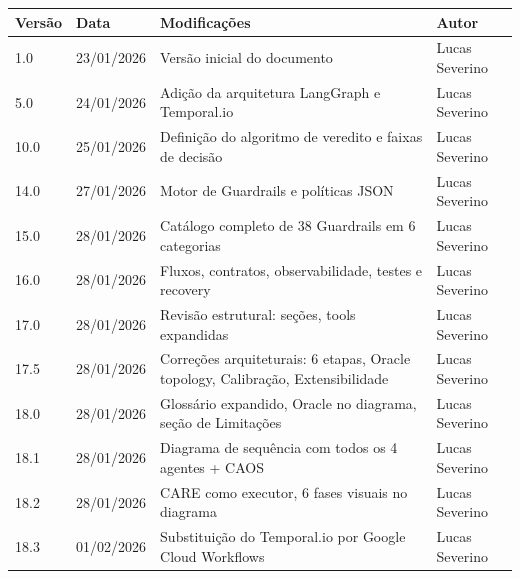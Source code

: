 \documentclass[12pt, a4paper]{article}
\newcommand{\authorName}{Lucas Severino}
\begin{document}
\begin{center} 
    \begin{tabular}{|m{1.5cm}|m{3cm}|m{7.5cm}|m{2.5cm}|} 
        \hline
        \textbf{Versão} & \textbf{Data} & \textbf{Modificações} & \textbf{Autor} \\
        \hline
        1.0 & 23/01/2026 & Versão inicial do documento & \authorName \\
        \hline
        5.0 & 24/01/2026 & Adição da arquitetura LangGraph e Temporal.io & \authorName \\
        \hline
        10.0 & 25/01/2026 & Definição do algoritmo de veredito e faixas de decisão & \authorName \\
        \hline
        14.0 & 27/01/2026 & Motor de Guardrails e políticas JSON & \authorName \\
        \hline
        15.0 & 28/01/2026 & Catálogo completo de 38 Guardrails em 6 categorias & \authorName \\
        \hline
        16.0 & 28/01/2026 & Fluxos, contratos, observabilidade, testes e recovery & \authorName \\
        \hline
        17.0 & 28/01/2026 & Revisão estrutural: seções, tools expandidas & \authorName \\
        \hline
        17.5 & 28/01/2026 & Correções arquiteturais: 6 etapas, Oracle topology, Calibração, Extensibilidade & \authorName \\
        \hline
        18.0 & 28/01/2026 & Glossário expandido, Oracle no diagrama, seção de Limitações & \authorName \\
        \hline
        18.1 & 28/01/2026 & Diagrama de sequência com todos os 4 agentes + CAOS & \authorName \\
        \hline
        18.2 & 28/01/2026 & CARE como executor, 6 fases visuais no diagrama & \authorName \\
        \hline
        18.3 & 01/02/2026 & Substituição do Temporal.io por Google Cloud Workflows & \authorName \\
        \hline
    \end{tabular}
\end{center} 
\newpage 

\end{document}
